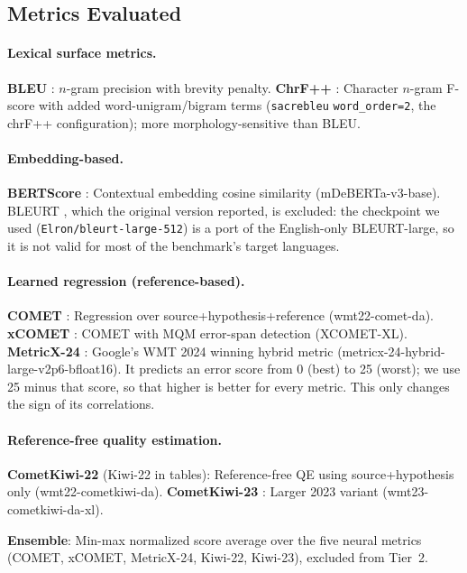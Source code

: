 \documentclass[11pt]{article}
\begin{document}
\subsection{Metrics Evaluated}

\paragraph{Lexical surface metrics.}
\textbf{BLEU} \cite{papineni2002bleu}: $n$-gram precision with brevity penalty.
\textbf{ChrF++} \cite{popovic2015chrf}: Character $n$-gram F-score with added word-unigram/bigram terms (\texttt{sacrebleu} \texttt{word\_order=2}, the chrF++ configuration); more morphology-sensitive than BLEU.

\paragraph{Embedding-based.}
\textbf{BERTScore} \cite{zhang2019bertscore}: Contextual embedding cosine similarity (mDeBERTa-v3-base).
BLEURT \cite{sellam2020bleurt}, which the original version reported, is excluded: the checkpoint we used (\texttt{Elron/bleurt-large-512}) is a port of the English-only BLEURT-large, so it is not valid for most of the benchmark's target languages.

\paragraph{Learned regression (reference-based).}
\textbf{COMET} \cite{rei2022comet22}: Regression over source+hypothesis+reference (wmt22-comet-da).
\textbf{xCOMET} \cite{guerreiro2023xcomet}: COMET with MQM error-span detection (XCOMET-XL).
\textbf{MetricX-24} \cite{juraska2024metricx}: Google's WMT 2024 winning hybrid metric (metricx-24-hybrid-large-v2p6-bfloat16). It predicts an error score from 0 (best) to 25 (worst); we use 25 minus that score, so that higher is better for every metric. This only changes the sign of its correlations.

\paragraph{Reference-free quality estimation.}
\textbf{CometKiwi-22} \cite{rei2022cometkiwi} (Kiwi-22 in tables): Reference-free QE using source+hypothesis only (wmt22-cometkiwi-da).
\textbf{CometKiwi-23} \cite{rei2023scaling}: Larger 2023 variant (wmt23-cometkiwi-da-xl).

\noindent\textbf{Ensemble}: Min-max normalized score average over the five neural metrics (COMET, xCOMET, MetricX-24, Kiwi-22, Kiwi-23), excluded from Tier~2.
\end{document}
